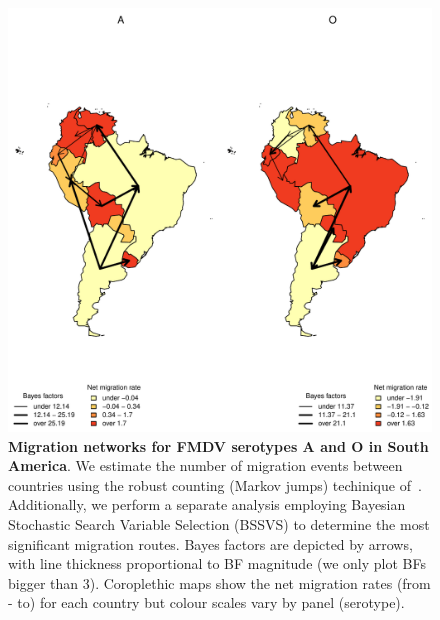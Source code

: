 \documentclass[10pt]{article}
\begin{document}
\begin{figure}[!ht]
\begin{center}
\includegraphics[scale=0.87]{FIGURES/PLOTS/MJandBFs.pdf}
\end{center}
\caption{\textbf{Migration networks for FMDV serotypes A and O in South America}.
We estimate the number of migration events between countries using the robust counting (Markov jumps) techinique of~\cite{Minin2008b}.
Additionally, we perform a separate analysis employing Bayesian Stochastic Search Variable Selection (BSSVS) to determine the most significant migration routes.
Bayes factors are depicted by arrows, with line thickness proportional to BF magnitude (we only plot BFs bigger than $3$).
Coroplethic maps show the net migration rates (from - to) for each country but colour scales vary by panel (serotype).
}
\label{fig:mj&BFs}
\end{figure}
\end{document}
